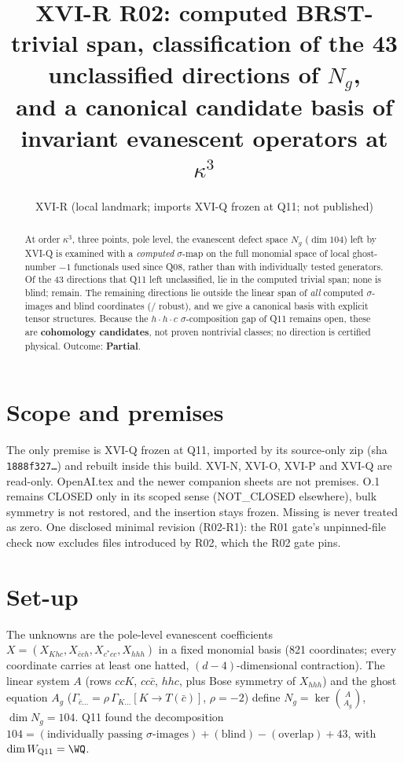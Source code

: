 \documentclass[11pt]{article}
\title{XVI-R R02: computed BRST-trivial span, classification of the 43 unclassified directions of $N_g$,\\
and a canonical candidate basis of invariant evanescent operators at $\kappa^3$}
\author{XVI-R (local landmark; imports XVI-Q frozen at Q11; not published)}
\date{}
\begin{document}
\maketitle
\begin{abstract}
At order $\kappa^3$, three points, pole level, the evanescent defect space $N_g$ ($\dim 104$) left by XVI-Q is examined
with a \emph{computed} $\sigma$-map on the full monomial space of local ghost-number $-1$ functionals used since Q08,
rather than with individually tested generators. Of the 43 directions that Q11 left unclassified, \NT{} lie in the computed
trivial span; none is blind; \NHC{} remain. The \NHC{} remaining directions lie outside the linear span of
\emph{all} computed $\sigma$-images and blind coordinates (\NR{}/\NHC{} robust), and we give a canonical basis with explicit
tensor structures. Because the $h\cdot h\cdot c$ $\sigma$-composition gap of Q11 remains open, these are
\textbf{cohomology candidates}, not proven nontrivial classes; no direction is certified physical. Outcome: \textbf{Partial}.
\end{abstract}

\section{Scope and premises}
The only premise is XVI-Q frozen at Q11, imported by its source-only zip (sha \texttt{1888f327\ldots}) and rebuilt inside
this build. XVI-N, XVI-O, XVI-P and XVI-Q are read-only. OpenAI.tex and the newer companion sheets are not premises.
O.1 remains CLOSED only in its scoped sense (NOT\_CLOSED elsewhere), bulk symmetry is not restored, and the insertion stays
frozen. Missing is never treated as zero. One disclosed minimal revision (R02-R1): the R01 gate's unpinned-file check now
excludes files introduced by R02, which the R02 gate pins.

\section{Set-up}
The unknowns are the pole-level evanescent coefficients $X=(X_{K hc},X_{\bar c ch},X_{c^*cc},X_{hhh})$ in a fixed monomial
basis (821 coordinates; every coordinate carries at least one hatted, $(d-4)$-dimensional contraction). The linear system
$A$ (rows $ccK$, $cc\bar c$, $hhc$, plus Bose symmetry of $X_{hhh}$) and the ghost equation $A_g$
($\Gamma_{\bar c\ldots}=\rho\,\Gamma_{K\ldots}[K\to T(\bar c)]$, $\rho=-2$) define
$N_g=\ker\binom{A}{A_g}$, $\dim N_g=104$. Q11 found the decomposition
$104 = (\text{individually passing }\sigma\text{-images}) + (\text{blind}) - (\text{overlap}) + 43$, with $\dim W_{\rm Q11}=\WQ$.
\end{document}
